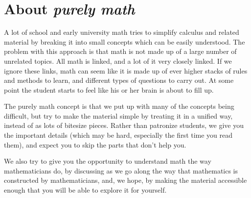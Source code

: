 \chapter{About \emph{purely math}}
A lot of school and early university math tries to simplify calculus and related material by breaking it into small concepts which can be easily understood. The problem with this approach is that math is not made up of a large number of unrelated topics. All math is linked, and a lot of it very closely linked. If we ignore these links, math can seem like it is made up of ever higher stacks of rules and methods to learn, and different types of questions to carry out. At some point the student starts to feel like his or her brain is about to fill up.

The purely math concept is that we put up with many of the concepts being difficult, but try to make the material simple by treating it in a unified way, instead of as lots of bitesize pieces. Rather than patronize students, we give you the important details (which may be hard, especially the first time you read them), and expect you to skip the parts that don't help you.

We also try to give you the opportunity to understand math the way mathematicians do, by discussing as we go along the way that mathematics is constructed by mathematicians, and, we hope, by making the material accessible enough that you will be able to explore it for yourself.